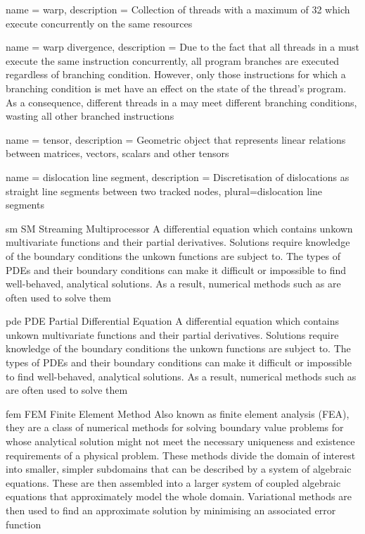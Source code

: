 {
	name = {warp},
	description = {Collection of threads with a maximum of 32 which execute concurrently on the same  resources}
}

{
	name = {warp divergence},
	description = {Due to the fact that all threads in a  must execute the same instruction concurrently, all program branches are executed regardless of branching condition. However, only those instructions for which a branching condition is met have an effect on the state of the thread's program. As a consequence, different threads in a  may meet different branching conditions, wasting all other branched instructions}
}

{
	name = {tensor},
	description = {Geometric object that represents linear relations between matrices, vectors, scalars and other tensors}
}

{
	name = {dislocation line segment},
	description = {Discretisation of dislocations as straight line segments between two tracked nodes},
	plural={dislocation line segments}
}

\newdualentry
{sm}
{SM}
{Streaming Multiprocessor}
{A differential equation which contains unkown multivariate functions and their partial derivatives. Solutions require knowledge of the boundary conditions the unkown functions are subject to. The types of PDEs and their boundary conditions can make it difficult or impossible to find well-behaved, analytical solutions. As a result, numerical methods such as  are often used to solve them}

\newdualentry
{pde}
{PDE}
{Partial Differential Equation}
{A differential equation which contains unkown multivariate functions and their partial derivatives. Solutions require knowledge of the boundary conditions the unkown functions are subject to. The types of PDEs and their boundary conditions can make it difficult or impossible to find well-behaved, analytical solutions. As a result, numerical methods such as  are often used to solve them}

\newdualentry
{fem}
{FEM}
{Finite Element Method}
{Also known as finite element analysis (FEA), they are a class of numerical methods for solving boundary value problems for  whose analytical solution might not meet the necessary uniqueness and existence requirements of a physical problem. These methods divide the domain of interest into smaller, simpler subdomains that can be described by a system of algebraic equations. These are then assembled into a larger system of coupled algebraic equations that approximately model the whole domain. Variational methods are then used to find an approximate solution by minimising an associated error function}

